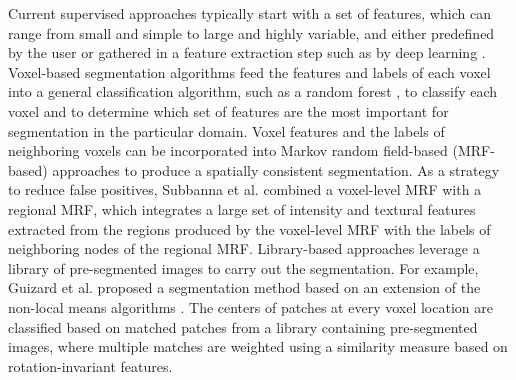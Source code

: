 Current supervised approaches typically start with a set of features, which can
range from small and simple to large and highly variable, and either predefined
by the user \cite{geremia2010,guizard2015,subbanna2015} or gathered in a feature
extraction step such as by deep learning \cite{yoo2014}. Voxel-based
segmentation algorithms \cite{geremia2010,yoo2014} feed the features and labels
of each voxel into a general classification algorithm, such as a random forest
\cite{breiman2001}, to classify each voxel and to determine which set of
features are the most important for segmentation in the particular domain.
Voxel features and the labels of neighboring voxels can be incorporated into
Markov random field-based (MRF-based) approaches
\cite{subbanna2009,subbanna2015} to produce a spatially consistent segmentation.
As a strategy to reduce false positives, Subbanna et al.
\cite{subbanna2015} combined a voxel-level MRF with a regional MRF, which
integrates a large set of intensity and textural features extracted from the
regions produced by the voxel-level MRF with the labels of neighboring nodes of
the regional MRF.
Library-based approaches leverage a library of pre-segmented images to carry out
the segmentation. For example, Guizard et al.
\cite{guizard2015} proposed a segmentation method based on an extension of the
non-local means algorithms \cite{coupe2011}. The centers of patches at every
voxel location are classified based on matched patches from a library containing
pre-segmented images, where multiple matches are weighted using a similarity
measure based on rotation-invariant features.

% 
% 

